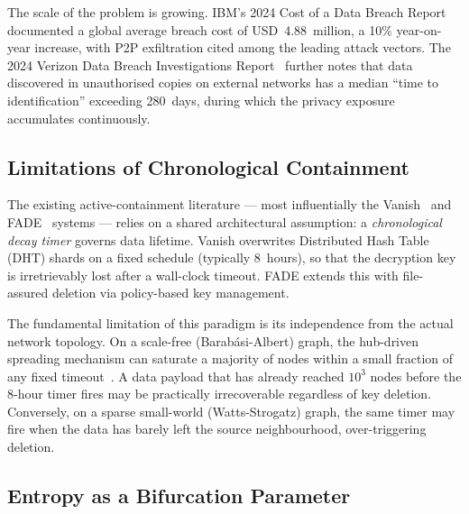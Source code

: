\documentclass[review,12pt]{elsarticle}
\begin{document}
The scale of the problem is growing. IBM's 2024 Cost of a Data Breach
Report~\cite{ibm2024breach} documented a global average breach cost of
USD~4.88~million, a 10\% year-on-year increase, with P2P exfiltration cited
among the leading attack vectors. The 2024 Verizon Data Breach Investigations
Report~\cite{verizon2024dbir} further notes that data discovered in unauthorised
copies on external networks has a median ``time to identification'' exceeding
280~days, during which the privacy exposure accumulates continuously.

\subsection{Limitations of Chronological Containment}

The existing active-containment literature --- most influentially the
Vanish~\cite{geambasu2009vanish} and FADE~\cite{tang2010fade} systems --- relies
on a shared architectural assumption: a \emph{chronological decay timer} governs
data lifetime. Vanish overwrites Distributed Hash Table (DHT) shards on a fixed
schedule (typically 8~hours), so that the decryption key is irretrievably lost
after a wall-clock timeout. FADE extends this with file-assured deletion via
policy-based key management.

The fundamental limitation of this paradigm is its independence from the actual
network topology. On a scale-free (Barab\'asi-Albert) graph, the hub-driven
spreading mechanism can saturate a majority of nodes within a small fraction of
any fixed timeout~\cite{barabasi1999emergence,pastor2015epidemic}. A data payload
that has already reached $10^3$ nodes before the 8-hour timer fires may be
practically irrecoverable regardless of key deletion. Conversely, on a
sparse small-world (Watts-Strogatz) graph, the same timer may fire when the
data has barely left the source neighbourhood, over-triggering deletion.

\subsection{Entropy as a Bifurcation Parameter}
\end{document}
